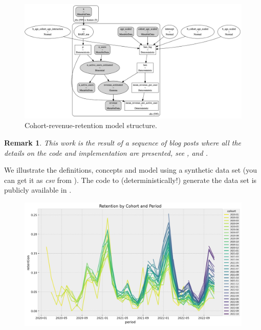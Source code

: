\documentclass[11pt]{amsart}
\newtheorem{remark}{Remark}
\begin{document}
\begin{figure}
    \centering
    \includegraphics[width=\textwidth]{images/revenue_retention_33_0.png}
    \caption{Cohort-revenue-retention model structure.}
    \label{fig:revenue_retention_model}
\end{figure}


\begin{remark}
This work is the result of a sequence of blog posts where all the details on the code
and implementation are presented, see \cite{orduz_retention},
\cite{orduz_retention_bart} and \cite{orduz_revenue_retention}.  
\end{remark}

We illustrate the definitions, concepts and model using a synthetic data set (you can
get it as {\em csv} from \cite{orduz_revenue_retention_data}). The code to
(deterministically!) generate the data set is publicly available in 
\cite{orduz_revenue_retention_data_code}.

\begin{figure}
\includegraphics[width=\textwidth]{images/revenue_retention_19_0.png}
\end{figure}
\end{document}
